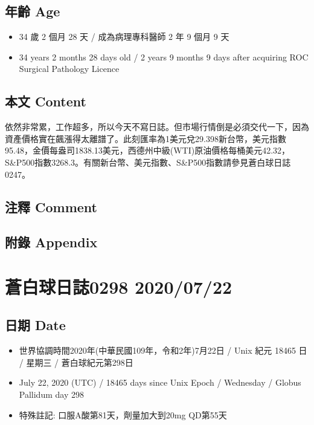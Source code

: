 \documentclass[a5paper, 11pt
]{book}
\providecommand{\tightlist}{%
  \setlength{\itemsep}{0pt}\setlength{\parskip}{0pt}}
\begin{document}
\hypertarget{ux5e74ux9f61-age-50}{%
\subsection{年齡 Age}\label{ux5e74ux9f61-age-50}}

\begin{itemize}
\tightlist
\item
  34 歲 2 個月 28 天 / 成為病理專科醫師 2 年 9 個月 9 天
\item
  34 years 2 months 28 days old / 2 years 9 months 9 days after
  acquiring ROC Surgical Pathology Licence
\end{itemize}

\hypertarget{ux672cux6587-content-50}{%
\subsection{本文 Content}\label{ux672cux6587-content-50}}

依然非常累，工作超多，所以今天不寫日誌。但市場行情倒是必須交代一下，因為資產價格實在飆漲得太離譜了。此刻匯率為1美元兌29.398新台幣，美元指數95.48，金價每盎司1838.13美元，西德州中級(WTI)原油價格每桶美元42.32，S\&P500指數3268.3。有關新台幣、美元指數、S\&P500指數請參見蒼白球日誌0247。

\hypertarget{ux6ce8ux91cb-comment-50}{%
\subsection{注釋 Comment}\label{ux6ce8ux91cb-comment-50}}

\hypertarget{ux9644ux9304-appendix-50}{%
\subsection{附錄 Appendix}\label{ux9644ux9304-appendix-50}}

\hypertarget{ux84bcux767dux7403ux65e5ux8a8c0298-20200722}{%
\section{蒼白球日誌0298
2020/07/22}\label{ux84bcux767dux7403ux65e5ux8a8c0298-20200722}}

\hypertarget{ux65e5ux671f-date-51}{%
\subsection{日期 Date}\label{ux65e5ux671f-date-51}}

\begin{itemize}
\tightlist
\item
  世界協調時間2020年(中華民國109年，令和2年)7月22日 / Unix 紀元 18465 日
  / 星期三 / 蒼白球紀元第298日
\item
  July 22, 2020 (UTC) / 18465 days since Unix Epoch / Wednesday / Globus
  Pallidum day 298
\item
  特殊註記: 口服A酸第81天，劑量加大到20mg QD第55天
\end{itemize}
\end{document}
